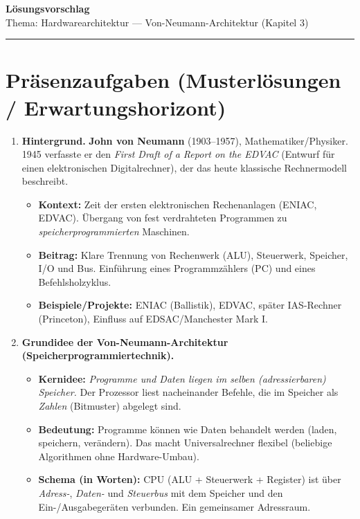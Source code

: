 \documentclass[11pt,a4paper]{scrartcl}
\newcommand{\sheettitle}[2]{%
	{\Large\bfseries #1}\\[-0.2em]
	{\normalsize #2}\par\hrule\vspace{1.0em}
}
\begin{document}
	
	\sheettitle{Lösungsvorschlag}{Thema: Hardwarearchitektur — Von-Neumann-Architektur (Kapitel 3)}
	
	\section*{Präsenzaufgaben (Musterlösungen / Erwartungshorizont)}
	
	\begin{enumerate}[leftmargin=*,label=\textbf{Aufgabe~\arabic*:}, itemsep=0.9em]
		
		\item \textbf{Hintergrund.}\quad
		\textbf{John von Neumann} (1903–1957), Mathematiker/Physiker. 1945 verfasste er den \emph{First Draft of a Report on the EDVAC} (Entwurf für einen elektronischen Digitalrechner), der das heute klassische Rechnermodell beschreibt.
		\begin{itemize}
			\item \textbf{Kontext:} Zeit der ersten elektronischen Rechenanlagen (ENIAC, EDVAC). Übergang von fest verdrahteten Programmen zu \emph{speicherprogrammierten} Maschinen.
			\item \textbf{Beitrag:} Klare Trennung von Rechenwerk (ALU), Steuerwerk, Speicher, I/O und Bus. Einführung eines Programmzählers (PC) und eines Befehlsholzyklus.
			\item \textbf{Beispiele/Projekte:} ENIAC (Ballistik), EDVAC, später IAS-Rechner (Princeton), Einfluss auf EDSAC/Manchester Mark I.
		\end{itemize}
		
		\item \textbf{Grundidee der Von-Neumann-Architektur (Speicherprogrammiertechnik).}\quad
		\begin{itemize}
			\item \textbf{Kernidee:} \emph{Programme und Daten liegen im selben (adressierbaren) Speicher.} Der Prozessor liest nacheinander Befehle, die im Speicher als \emph{Zahlen} (Bitmuster) abgelegt sind.
			\item \textbf{Bedeutung:} Programme können wie Daten behandelt werden (laden, speichern, verändern). Das macht Universalrechner flexibel (beliebige Algorithmen ohne Hardware-Umbau).
			\item \textbf{Schema (in Worten):} CPU (ALU + Steuerwerk + Register) ist über \emph{Adress-}, \emph{Daten-} und \emph{Steuerbus} mit dem Speicher und den Ein-/Ausgabegeräten verbunden. Ein gemeinsamer Adressraum.
		\end{itemize}
		

\end{enumerate}
\end{document}
